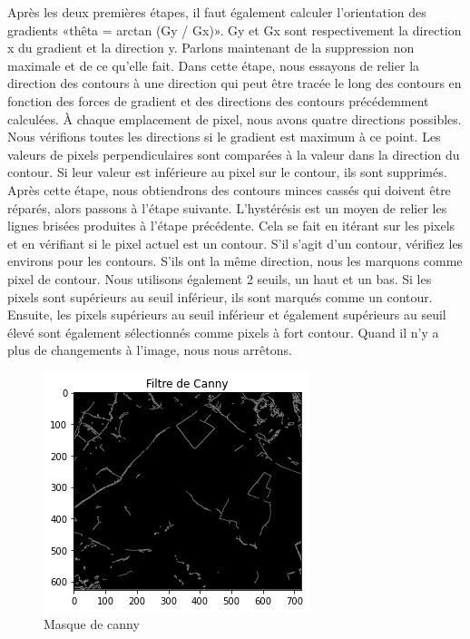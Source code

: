 \documentclass[12pt, openany]{report}
\begin{document}
Après les deux premières étapes, il faut également calculer l'orientation des gradients «thêta = arctan (Gy / Gx)». Gy et Gx sont respectivement la direction x du gradient et la direction y.
Parlons maintenant de la suppression non maximale et de ce qu'elle fait. Dans cette étape, nous essayons de relier la direction des contours à une direction qui peut être tracée le long des contours en fonction des forces de gradient et des directions des contours précédemment calculées. À chaque emplacement de pixel, nous avons quatre directions possibles. Nous vérifions toutes les directions si le gradient est maximum à ce point. Les valeurs de pixels perpendiculaires sont comparées à la valeur dans la direction du contour. Si leur valeur est inférieure au pixel sur le contour, ils sont supprimés. Après cette étape, nous obtiendrons des contours minces cassés qui doivent être réparés, alors passons à l'étape suivante.
L'hystérésis est un moyen de relier les lignes brisées produites à l'étape précédente. Cela se fait en itérant sur les pixels et en vérifiant si le pixel actuel est un contour. S'il s'agit d'un contour, vérifiez les environs pour les contours. S'ils ont la même direction, nous les marquons comme pixel de contour. Nous utilisons également 2 seuils, un haut et un bas. Si les pixels sont supérieurs au seuil inférieur, ils sont marqués comme un contour. Ensuite, les pixels supérieurs au seuil inférieur et également supérieurs au seuil élevé sont également sélectionnés comme pixels à fort contour. Quand il n'y a plus de changements à l'image, nous nous arrêtons.

\begin{figure}[H]
\centering
\includegraphics[scale=0.78]{canny.png}
\caption{Masque de canny}
\end{figure}
\end{document}
